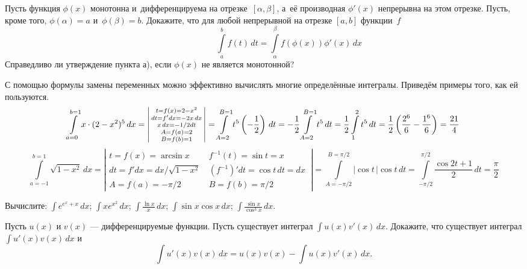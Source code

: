 \documentclass[a4paper,12pt]{article}
\begin{document}
 Пусть функция $\phi(x)$ монотонна и~дифференцируема на отрезке~$[\alpha,\beta]$, а~её производная $\phi'(x)$ непрерывна на этом отрезке. Пусть, кроме того, $\phi(\alpha)=a$ и~$\phi(\beta)=b$. Докажите, что для любой непрерывной на отрезке $[a,b]$ функции~$f$
\vskip -9mm
$$
\qquad\qquad\qquad\int\limits_a^bf(t)\,dt=\int\limits_{\alpha}^{\beta}f(\phi(x))\phi'(x)\,dx
$$
\vskip -2mm
 Справедливо ли утверждение пункта а), если $\phi(x)$ не является монотонной?

С помощью формулы замены переменных можно эффективно вычислять многие определённые интегралы.
Приведём примеры того, как ей пользуются.
\vspace*{-2mm}
$$
\int\limits_{a=0}^{b=1} x \cdot (2 - x^2)^5 \, dx =
\left|
\begin{smallmatrix}
t = f(x)=2-x^2\\
dt = f'dx=-2x\,dx\\
x\,dx = -1/2 dt\\
A = f(a) = 2\\
B = f(b) = 1
\end{smallmatrix}
\right|
=\int\limits_{A=2}^{B=1} t^5 \left(-\dfrac{1}{2}\right)\,dt
=-\dfrac{1}{2} \int\limits_{A=2}^{B=1} t^5\,dt
=\dfrac{1}{2} \int\limits_{1}^{2} t^5\,dt
=\dfrac{1}{2} \left(\dfrac{2^6}{6} - \dfrac{1^6}{6}\right)
=\dfrac{21}{4}
$$
\vspace*{-2mm}
$$
\int\limits_{a=-1}^{b=1} \sqrt{1-x^2} \, dx =
\left|
\begin{smallmatrix}
t = f(x)=\arcsin x &           f^{-1}(t)= \sin t = x \\
dt = f'dx=dx/\sqrt{1-x^2}\ & (f^{-1})'dt = \cos t\,dt = dx\ \\
         A = f(a) = -\pi/2& B = f(b) = \pi/2
\end{smallmatrix}
\right|
=\int\limits_{A=-\pi/2}^{B=\pi/2} |\cos t\,| \cos t \,dt = \int\limits_{-\pi/2}^{\pi/2} \dfrac{\cos 2t +1}{2}\, dt = \dfrac{\pi}{2}
$$
\vspace*{-3mm}


Вычислите:
 $\int e^{e^x+x}\, dx$;
 $\int xe^{x^2}\, dx$;
 $\int \frac{\ln x}{x}\, dx$;
 $\int \sin x \cos x \, dx$;
 $\int \frac{\sin x }{\cos^3 x }\, dx$.

Пусть $u(x)$ и $v(x)$ --- дифференцируемые функции.
Пусть существует интеграл $\int u(x)v'(x)\, dx$.
Докажите, что существует интеграл $\int u'(x)v(x)\, dx$ и
\vspace*{-3mm}
$$
\int u'(x)v(x)\, dx=u(x)v(x)-\int u(x)v'(x)\, dx.
$$
\vspace*{-5mm}
\end{document}
